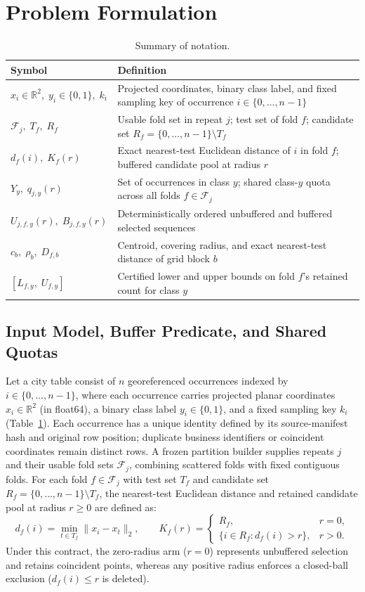 \documentclass[sigconf, nonacm]{acmart}
\begin{document}
\section{Problem Formulation}
\begin{table}[t]
\caption{Summary of notation.}
\label{tab:notation}\centering\small
\begin{tabular}{ll}\toprule
Symbol & Definition\\\midrule
$x_i\in\mathbb{R}^2,\; y_i\in\{0,1\},\; k_i$ & Projected coordinates, binary class label, and fixed sampling key of occurrence $i\in\{0,\dots,n-1\}$\\
$\mathcal{F}_j,\; T_f,\; R_f$ & Usable fold set in repeat $j$; test set of fold $f$; candidate set $R_f=\{0,\dots,n-1\}\setminus T_f$\\
$d_f(i),\; K_f(r)$ & Exact nearest-test Euclidean distance of $i$ in fold $f$; buffered candidate pool at radius $r$\\
$Y_y,\; q_{j,y}(r)$ & Set of occurrences in class $y$; shared class-$y$ quota across all folds $f\in\mathcal{F}_j$\\
$U_{j,f,y}(r),\; B_{j,f,y}(r)$ & Deterministically ordered unbuffered and buffered selected sequences\\
$c_b,\; \rho_b,\; D_{f,b}$ & Centroid, covering radius, and exact nearest-test distance of grid block $b$\\
$[L_{f,y},\; U_{f,y}]$ & Certified lower and upper bounds on fold $f$'s retained count for class $y$\\\bottomrule
\end{tabular}
\end{table}

\subsection{Input Model, Buffer Predicate, and Shared Quotas}
Let a city table consist of $n$ georeferenced occurrences indexed by $i\in\{0,\dots,n-1\}$, where each occurrence carries projected planar coordinates $x_i\in\mathbb{R}^2$ (in float64), a binary class label $y_i\in\{0,1\}$, and a fixed sampling key $k_i$ (Table~\ref{tab:notation}). Each occurrence has a unique identity defined by its source-manifest hash and original row position; duplicate business identifiers or coincident coordinates remain distinct rows. A frozen partition builder supplies repeats $j$ and their usable fold sets $\mathcal{F}_j$, combining scattered folds with fixed contiguous folds. For each fold $f\in\mathcal{F}_j$ with test set $T_f$ and candidate set $R_f=\{0,\dots,n-1\}\setminus T_f$, the nearest-test Euclidean distance and retained candidate pool at radius $r\ge 0$ are defined as:
\begin{equation}
d_f(i)=\min_{t\in T_f}\|x_i-x_t\|_2,
\qquad
K_f(r)=
\begin{cases}
R_f, & r=0,\\
\{i\in R_f: d_f(i)>r\}, & r>0.
\end{cases}
\label{eq:buffer}
\end{equation}
Under this contract, the zero-radius arm ($r=0$) represents unbuffered selection and retains coincident points, whereas any positive radius enforces a closed-ball exclusion ($d_f(i)\le r$ is deleted).
\end{document}

